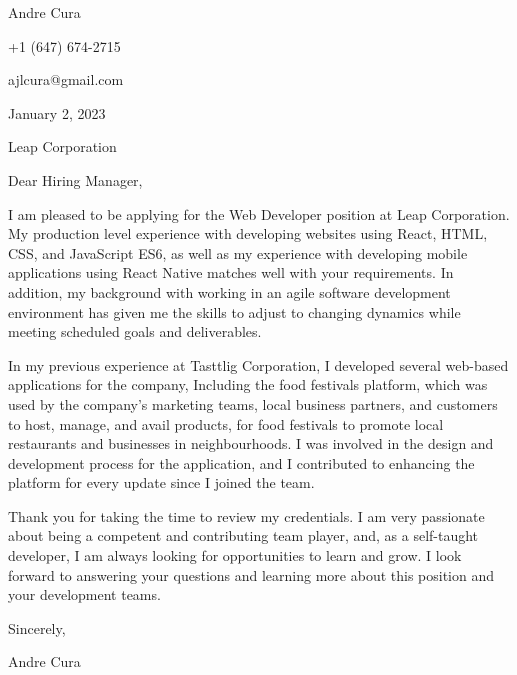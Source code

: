 \documentclass[letterpaper,12pt]{article}
\begin{document}
Andre Cura

+1 (647) 674-2715

ajlcura@gmail.com

\vspace{0.25in}

January 2, 2023

\vspace{0.25in}

Leap Corporation

\vspace{0.5in}

Dear Hiring Manager,

\vspace{0.5in}

I am pleased to be applying for the Web Developer position at Leap Corporation.
My production level experience with developing websites using React, HTML, CSS, and JavaScript ES6,
as well as my experience with developing mobile applications using React Native
matches well with your requirements.
In addition, my background with working in an agile software development environment
has given me the skills to adjust to changing dynamics
while meeting scheduled goals and deliverables.

\vspace{0.25in}

In my previous experience at Tasttlig Corporation,
I developed several web-based applications for the company,
Including the food festivals platform,
which was used by the company's marketing teams,
local business partners, and customers
to host, manage, and avail products, for food festivals
to promote local restaurants and businesses in neighbourhoods.
I was involved in the design and development process for the application,
and I contributed to enhancing the platform for every update since I joined the team.

% 

\vspace{0.25in}

Thank you for taking the time to review my credentials.
I am very passionate about being a competent and contributing team player, and,
as a self-taught developer, I am always looking for opportunities to learn and grow.
I look forward to answering your questions and learning more about this position
and your development teams.

\vspace{0.5in}
Sincerely,

Andre Cura
\end{document}
